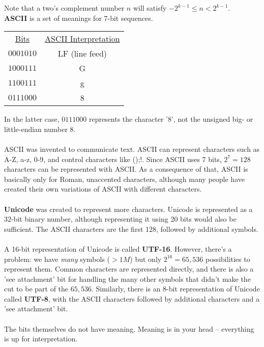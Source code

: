 \documentclass[]{article}
\begin{document}
	Note that a two's complement number $n$ will satisfy $-2^{k-1} \le n < 2^{k-1}$. \\

	\textbf{ASCII} is a set of meanings for 7-bit sequences.
	
	\begin{center}
		\begin{tabular}{cc}
			\underline{Bits} & \underline{ASCII Interpretation} \\
			$0001010$ & LF (line feed) \\
			$1000111$ & G \\
			$1100111$ & g \\
			$0111000$ & 8
		\end{tabular}
	\end{center}
	
	In the latter case, $0111000$ represents the character '$8$', not the unsigned big- or little-endian number $8$.
	\\ \\
	ASCII was invented to communicate text. ASCII can represent characters such as A-Z, a-z, 0-9, and control characters like ();!. Since ASCII uses 7 bits, $2^7 = 128$ characters can be represented with ASCII. As a consequence of that, ASCII is basically only for Roman, unaccented characters, although many people have created their own variations of ASCII with different characters.
	\\ \\
	\textbf{Unicode} was created to represent more characters. Unicode is represented as a 32-bit binary number, although representing it using 20 bits would also be sufficient. The ASCII characters are the first 128, followed by additional symbols.
	\\ \\
	A 16-bit representation of Unicode is called \textbf{UTF-16}. However, there's a problem: we have \emph{many} symbols ($> 1M$) but only $2^16 = 65,536$ possibilities to represent them. Common characters are represented directly, and there is also a 'see attachment' bit for handling the many other symbols that didn't make the cut to be part of the $65,536$. Similarly, there is an 8-bit representation of Unicode called \textbf{UTF-8}, with the ASCII characters followed by additional characters and a 'see attachment' bit.
	\\ \\
	The bits themselves do not have meaning. Meaning is in your head -- everything is up for interpretation.
\end{document}
